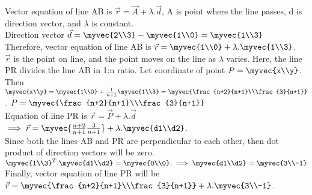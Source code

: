 \documentclass[journal,12pt,twocolumn]{IEEEtran}
\begin{document}
Vector equation of line AB is $\vec{r} = \vec{A}+\lambda.\vec{d}$, A is point where the line passes, d is direction vector, and $\lambda$ is constant. \\

Direction vector $\vec{d} = \myvec{2\\3}-\myvec{1\\0} = \myvec{1\\3}$\\
Therefore, vector equation of line AB is $\vec{r}=\myvec{1\\0}+\lambda.\myvec{1\\3}$.\\
$\vec{r}$ is the point on line, and the point moves on the line as $\lambda$ varies. Here, the line PR divides the line AB in 1:n ratio. Let coordinate of point $ P  = \myvec{x\\y}$. Then $\myvec{x\\y} = \myvec{1\\0}+\frac{1}{n+1}\myvec{1\\3} = \myvec{\frac{n+2}{n+1}\\\frac{3}{n+1}}$.  $P=\myvec{\frac{n+2}{n+1}\\\frac{3}{n+1}}$\\
Equation of line PR is $\vec{r}=\vec{P}+\lambda.\vec{d}$\\
$\implies \vec{r}=\myvec{\frac{n+2}{n+1}\frac{3}{n+1}}+\lambda.\myvec{d1\\d2}$.\\
Since both the lines AB and PR are perpendicular to each other, then dot product of direction vectors will be zero.\\

$\myvec{1\\3}^T.\myvec{d1\\d2}=\myvec{0\\0}. \implies  \myvec{d1\\d2} = \myvec{3\\-1}$\\
Finally, vector equation of line PR will be\\ $\vec{r}=\myvec{\frac{n+2}{n+1}\\\frac{3}{n+1}}+\lambda.\myvec{3\\-1}$.
\end{document}
